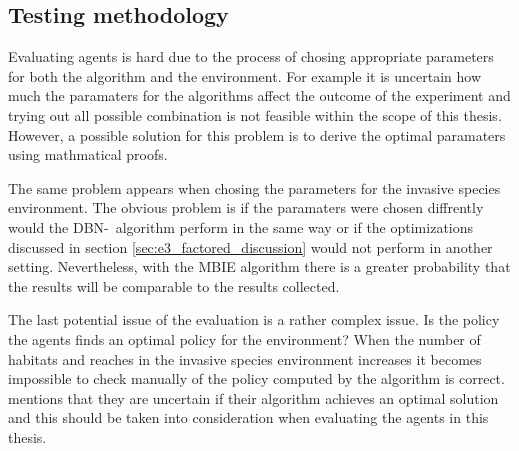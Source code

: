 \subsection{Testing methodology}

Evaluating agents is hard due to the process of chosing appropriate parameters
for both the algorithm and the environment. For example it is uncertain how
much the paramaters for the algorithms affect the outcome of the experiment and
trying out all possible combination is not feasible within the scope of this
thesis. However, a possible solution for this problem is to derive the optimal
paramaters using mathmatical proofs.

The same problem appears when chosing the parameters for the invasive species
environment. The obvious problem is if the paramaters were chosen diffrently
would the DBN-\etre\ algorithm perform in the same way or if the optimizations
discussed in section \ref{sec:e3_factored_discussion} would not perform in
another setting. Nevertheless, with the MBIE algorithm there is a greater
probability that the results will be comparable to the results collected.

The last potential issue of the evaluation is a rather complex issue. Is the
policy the agents finds an optimal policy for the environment?  When the
number of habitats and reaches in the invasive species environment increases it
becomes impossible to check manually of the policy computed by the algorithm is
correct. \textcite{dietterich2013pac} mentions that they are uncertain if
their algorithm achieves an optimal solution and this should be taken into
consideration when evaluating the agents in this thesis.
